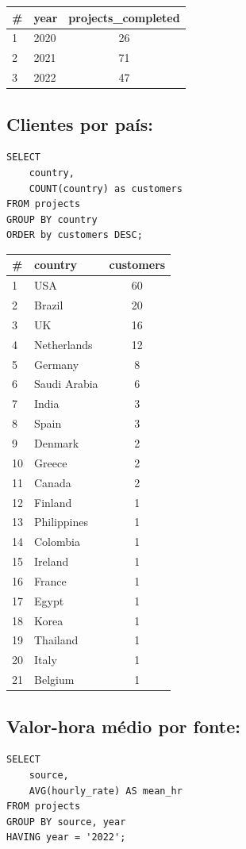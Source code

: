 \documentclass{queriessql}
\begin{document}
\begin{tabular}{llc}
\# & \textbf{year} & \textbf{projects\_completed} \\ \hline
1 & 2020 & 26 \\
2 & 2021 & 71 \\
3 & 2022 & 47
\end{tabular}


\subsection{Clientes por país:}
\begin{lstlisting}
SELECT 
    country,
    COUNT(country) as customers
FROM projects
GROUP BY country
ORDER by customers DESC;
\end{lstlisting}

\begin{tabular}{llc}
    \# & \textbf{country} & \textbf{customers} \\ \hline
    1 & USA& 60 \\
    2 & Brazil & 20 \\
    3 & UK & 16 \\
    4 & Netherlands & 12 \\
    5 & Germany & 8 \\
    6 & Saudi Arabia & 6 \\
    7 & India & 3 \\
    8 & Spain & 3 \\
    9 & Denmark & 2 \\
    10 & Greece & 2 \\
    11 & Canada & 2 \\
    12 & Finland & 1 \\
    13 & Philippines & 1 \\
    14 & Colombia & 1 \\
    15 & Ireland & 1 \\
    16 & France & 1 \\
    17 & Egypt & 1 \\
    18 & Korea & 1 \\
    19 & Thailand& 1 \\
    20 & Italy & 1 \\
    21 & Belgium & 1
\end{tabular}

\subsection{Valor-hora médio por fonte:}
\begin{lstlisting}
SELECT 
    source,
    AVG(hourly_rate) AS mean_hr
FROM projects
GROUP BY source, year
HAVING year = '2022';
\end{lstlisting}
\end{document}
